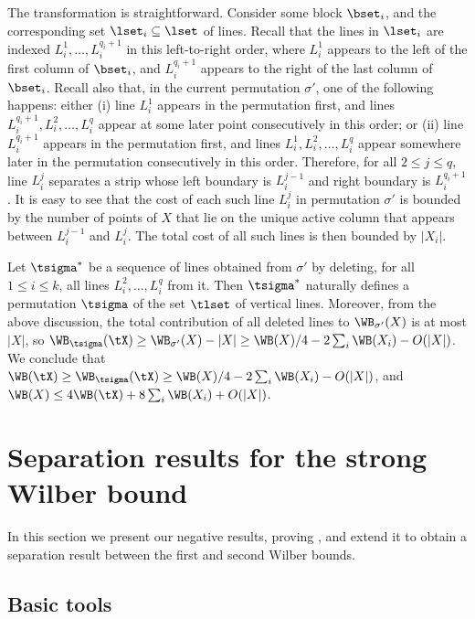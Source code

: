 \documentclass{toc}
\begin{document}
The transformation is straightforward. Consider some block $\bset_i$, and the corresponding set $\lset_i\subseteq \lset$ of lines.
Recall that the lines in $\lset_i$ are indexed $L^1_i,\ldots,L^{q_i+1}_i$ in this left-to-right order, where $L^1_i$ appears to the left of the first column of $\bset_i$, and $L^{q_i+1}_i$ appears to the right of the last column of $\bset_i$. Recall also that, in the current permutation $\sigma'$, one of the following happens: either (i) line $L^1_i$ appears in the permutation first, and lines $L^{q_i+1}_i,L^2_i,\ldots, L^q_i$ appear at some later point consecutively in this order; or (ii) line $L^{q_i+1}_i$ appears in the permutation first, and lines $L^1_i,L^2_i,\ldots,L^q_i$ appear somewhere later in the permutation consecutively in this order. Therefore, for all $2\leq j\leq q$, line $L_i^j$ separates a strip whose left boundary is $L_i^{j-1}$ and right boundary is $L_i^{q_i+1}$. It is easy to see that the cost of each such line $L_i^j$ in permutation $\sigma'$ is bounded by the number of points of $X$ that lie on the unique active column that appears between $L_i^{j-1}$ and $L_i^j$. The total cost of all such lines is then bounded by $|X_i|$.

Let $\tsigma^*$ be a sequence of lines obtained from $\sigma'$ by deleting, for all $1\leq i\leq k$, all lines $L_i^2,\ldots,L_i^q$ from it. Then $\tsigma^*$ naturally defines a permutation $\tsigma$ of the set $\tlset$ of vertical lines. Moreover, from the above discussion, the total contribution of all deleted lines to $\WB_{\sigma'}(X)$ is at most $|X|$, so $\WB_{\tsigma}(\tX)\geq \WB_{\sigma'}(X)-|X|\geq \WB(X)/4-2\sum_i\WB(X_i)-O(|X|)$. We conclude that $\WB(\tX)\geq \WB_{\tsigma}(\tX)\geq \WB(X)/4-2\sum_i\WB(X_i)-O(|X|)$, and $\WB(X)\leq 4\WB(\tX)+8\sum_i\WB(X_i)+O(|X|)$.


%

\section{Separation results for the strong Wilber bound}
\label{sec: negative}

In this section we present our negative results,  proving , and extend it to obtain a separation result between the first and second Wilber bounds. 

%
%
%
%
%
%
%
%
%
%
%
%
%
%
%
%
%




\subsection{Basic tools}
\label{sec: sequences} 
\end{document}
